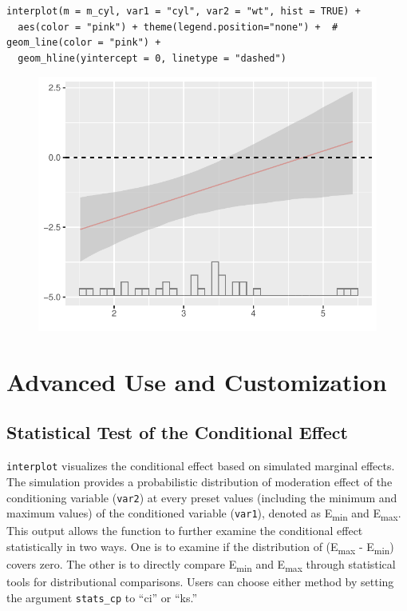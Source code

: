 \documentclass[
  article]{jss}
\begin{document}
\begin{verbatim}
interplot(m = m_cyl, var1 = "cyl", var2 = "wt", hist = TRUE) +
  aes(color = "pink") + theme(legend.position="none") +  # geom_line(color = "pink") + 
  geom_hline(yintercept = 0, linetype = "dashed")
\end{verbatim}

\begin{figure}[H]

{\centering \includegraphics{jss_manuscript_files/figure-pdf/unnamed-chunk-13-1.pdf}

}

\end{figure}

\hypertarget{advanced-use-and-customization}{%
\section{Advanced Use and
Customization}\label{advanced-use-and-customization}}

\hypertarget{statistical-test-of-the-conditional-effect}{%
\subsection{Statistical Test of the Conditional
Effect}\label{statistical-test-of-the-conditional-effect}}

\texttt{interplot} visualizes the conditional effect based on simulated
marginal effects. The simulation provides a probabilistic distribution
of moderation effect of the conditioning variable (\texttt{var2}) at
every preset values (including the minimum and maximum values) of the
conditioned variable (\texttt{var1}), denoted as E\textsubscript{min}
and E\textsubscript{max}. This output allows the function to further
examine the conditional effect statistically in two ways. One is to
examine if the distribution of (E\textsubscript{max} -
E\textsubscript{min}) covers zero. The other is to directly compare
E\textsubscript{min} and E\textsubscript{max} through statistical tools
for distributional comparisons. Users can choose either method by
setting the argument \texttt{stats\_cp} to ``ci'' or ``ks.''
\end{document}

